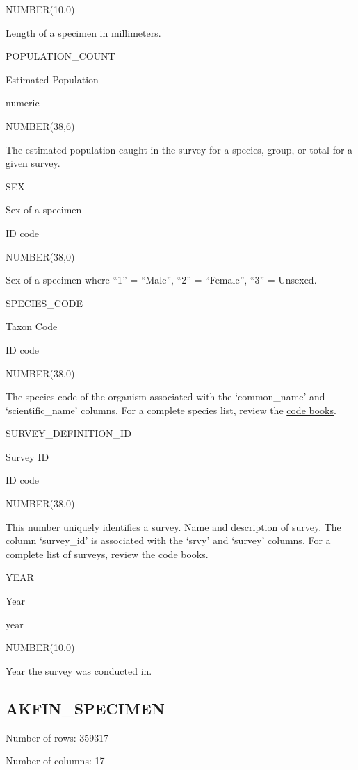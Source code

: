 \documentclass[
  letterpaper,
  oneside,
  open=any]{scrbook}
\begin{document}
NUMBER(10,0)

Length of a specimen in millimeters.

POPULATION\_COUNT

Estimated Population

numeric

NUMBER(38,6)

The estimated population caught in the survey for a species, group, or
total for a given survey.

SEX

Sex of a specimen

ID code

NUMBER(38,0)

Sex of a specimen where ``1'' = ``Male'', ``2'' = ``Female'', ``3'' =
Unsexed.

SPECIES\_CODE

Taxon Code

ID code

NUMBER(38,0)

The species code of the organism associated with the `common\_name' and
`scientific\_name' columns. For a complete species list, review the
\href{https://www.fisheries.noaa.gov/resource/document/groundfish-survey-species-code-manual-and-data-codes-manual}{code
books}.

SURVEY\_DEFINITION\_ID

Survey ID

ID code

NUMBER(38,0)

This number uniquely identifies a survey. Name and description of
survey. The column `survey\_id' is associated with the `srvy' and
`survey' columns. For a complete list of surveys, review the
\href{https://www.fisheries.noaa.gov/resource/document/groundfish-survey-species-code-manual-and-data-codes-manual}{code
books}.

YEAR

Year

year

NUMBER(10,0)

Year the survey was conducted in.

\hypertarget{akfin_specimen}{%
\subsection{AKFIN\_SPECIMEN}\label{akfin_specimen}}

Number of rows: 359317

Number of columns: 17
\end{document}
